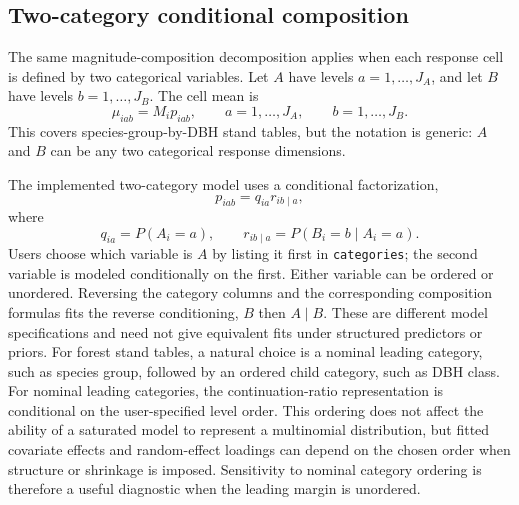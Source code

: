 \documentclass[11pt]{article}
\begin{document}
\subsection{Two-category conditional composition}

The same magnitude-composition decomposition applies when each response cell is
defined by two categorical variables. Let \(A\) have levels
\(a=1,\ldots,J_A\), and let \(B\) have levels \(b=1,\ldots,J_B\). The cell mean
is
\begin{equation}
  \mu_{iab}=M_i p_{iab},
  \qquad
  a=1,\ldots,J_A,
  \qquad
  b=1,\ldots,J_B.
  \label{eq:two-category-mean}
\end{equation}
This covers species-group-by-DBH stand tables, but the notation is generic:
\(A\) and \(B\) can be any two categorical response dimensions.

The implemented two-category model uses a conditional factorization,
\begin{equation}
  p_{iab}=q_{ia}r_{ib\mid a},
  \label{eq:conditional-factorization}
\end{equation}
where
\begin{equation}
  q_{ia}=P(A_i=a),
  \qquad
  r_{ib\mid a}=P(B_i=b\mid A_i=a).
  \label{eq:conditional-components}
\end{equation}
Users choose which variable is \(A\) by listing it first in
\texttt{categories}; the second variable is modeled conditionally on the first.
Either variable can be ordered or unordered. Reversing the category columns
and the corresponding composition formulas fits the reverse conditioning,
\(B\) then \(A\mid B\). These are different model specifications and need not
give equivalent fits under structured predictors or priors. For forest stand
tables, a natural choice is a nominal leading category, such as species group,
followed by an ordered child category, such as DBH class.
For nominal leading categories, the continuation-ratio representation is
conditional on the user-specified level order. This ordering does not affect the
ability of a saturated model to represent a multinomial distribution, but fitted
covariate effects and random-effect loadings can depend on the chosen order when
structure or shrinkage is imposed. Sensitivity to nominal category ordering is
therefore a useful diagnostic when the leading margin is unordered.
\end{document}
